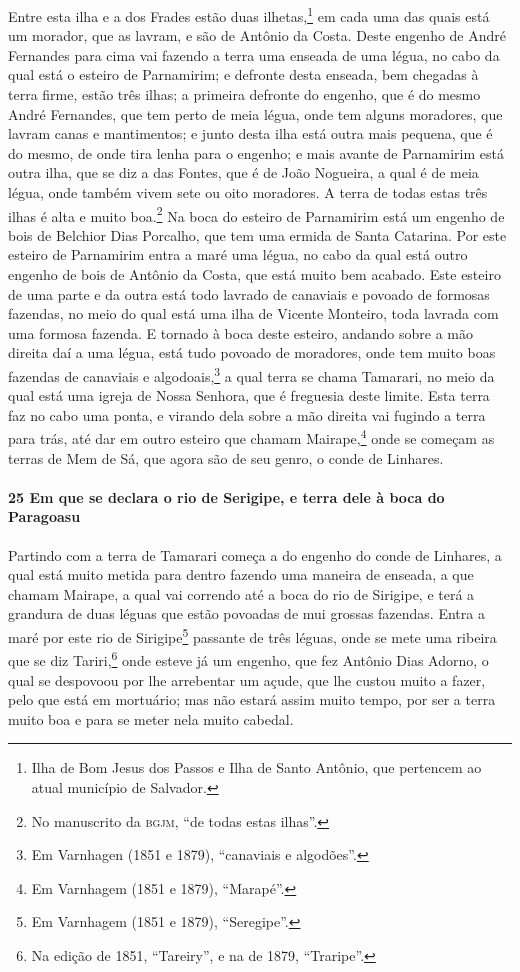 \begin{linenumbers}
Entre esta ilha e a dos Frades estão duas ilhetas,\footnote{ Ilha de Bom Jesus dos Passos
e Ilha de Santo Antônio, que pertencem ao atual município de Salvador.} em cada uma das
quais está um morador, que as lavram, e são de Antônio da Costa. Deste engenho de André
Fernandes para cima vai fazendo a terra uma enseada de uma légua, no cabo da qual está o
esteiro de Parnamirim; e defronte desta enseada, bem chegadas à terra firme, estão três
ilhas; a primeira defronte do engenho, que é do mesmo André Fernandes, que tem perto de
meia légua, onde tem alguns moradores, que lavram canas e mantimentos; e junto desta ilha
está outra mais pequena, que é do mesmo, de onde tira lenha para o engenho; e mais avante
de Parnamirim está outra ilha, que se diz a das Fontes, que é de João Nogueira, a qual é
de meia légua, onde também vivem sete ou oito moradores. A terra de todas estas três ilhas
é alta e muito boa.\footnote{ No manuscrito da \textsc{bgjm}, ``de todas estas ilhas''.}
Na boca do esteiro de Parnamirim está um engenho de bois de Belchior Dias Porcalho, que
tem uma ermida de Santa Catarina. Por este esteiro de Parnamirim entra a maré uma légua,
no cabo da qual está outro engenho de bois de Antônio da Costa, que está muito bem
acabado. Este esteiro de uma parte e da outra está todo lavrado de canaviais e povoado de
formosas fazendas, no meio do qual está uma ilha de Vicente Monteiro, toda lavrada com uma
formosa fazenda. E tornado à boca deste esteiro, andando sobre a mão direita daí a uma
légua, está tudo povoado de moradores, onde tem muito boas fazendas de canaviais e
algodoais,\footnote{ Em Varnhagen (1851 e 1879), ``canaviais e algodões''.} a qual terra
se chama Tamarari, no meio da qual está uma igreja de Nossa Senhora, que é freguesia deste
limite. Esta terra faz no cabo uma ponta, e virando dela sobre a mão direita vai fugindo a
terra para trás, até dar em outro esteiro que chamam Mairape,\footnote{ Em Varnhagem (1851
e 1879), ``Marapé''.} onde se começam as terras de Mem de Sá, que agora são de seu genro,
o conde de Linhares.

\paragraph{25 Em que se declara o rio de Serigipe, e terra dele à boca do Paragoasu}\quad
Partindo com a terra de Tamarari começa a do engenho do conde de Linhares, a qual está
muito metida para dentro fazendo uma maneira de enseada, a que chamam Mairape, a qual vai
correndo até a boca do rio de Sirigipe, e terá a grandura de duas léguas que estão
povoadas de mui grossas fazendas. Entra a maré por este rio de Sirigipe\footnote{ Em
Varnhagem (1851 e 1879), ``Seregipe''.} passante de três léguas, onde se mete uma ribeira
que se diz Tariri,\footnote{ Na edição de 1851, ``Tareiry'', e na de 1879, ``Traripe''.}
onde esteve já um engenho, que fez Antônio Dias Adorno, o qual se despovoou por lhe
arrebentar um açude, que lhe custou muito a fazer, pelo que está em mortuário;
mas não estará assim muito tempo, por ser a terra muito boa e
para se meter nela muito cabedal.


\end{linenumbers}
